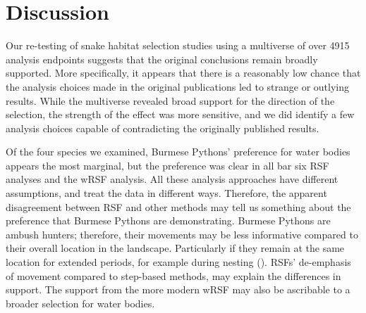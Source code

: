 \documentclass[10pt,a4paper]{article}
\begin{document}
\section{Discussion}\label{discussion}

Our re-testing of snake habitat selection studies using a multiverse of over 4915 analysis endpoints suggests that the original conclusions remain broadly supported.
More specifically, it appears that there is a reasonably low chance that the analysis choices made in the original publications led to strange or outlying results.
While the multiverse revealed broad support for the direction of the selection, the strength of the effect was more sensitive, and we did identify a few analysis choices capable of contradicting the originally published results.

Of the four species we examined, Burmese Pythons' preference for water bodies appears the most marginal, but the preference was clear in all bar six RSF analyses and the wRSF analysis.
All these analysis approaches have different assumptions, and treat the data in different ways.
Therefore, the apparent disagreement between RSF and other methods may tell us something about the preference that Burmese Pythons are demonstrating.
Burmese Pythons are ambush hunters; therefore, their movements may be less informative compared to their overall location in the landscape.
Particularly if they remain at the same location for extended periods, for example during nesting ().
RSFs' de-emphasis of movement compared to step-based methods, may explain the differences in support.
The support from the more modern wRSF may also be ascribable to a broader selection for water bodies.
\end{document}
